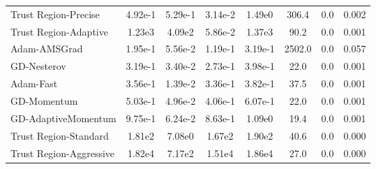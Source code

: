 \documentclass{article}
\begin{document}
\begin{table}[htbp]
{\begin{tabular}{p{2.5cm}*{7}{c}}
Trust Region-Precise & 4.92e-1 & 5.29e-1 & 3.14e-2 & 1.49e0 & 306.4 & 0.0 & 0.002 \\
Trust Region-Adaptive & 1.23e3 & 4.09e2 & 5.86e-2 & 1.37e3 & 90.2 & 0.0 & 0.001 \\
Adam-AMSGrad & 1.95e-1 & 5.56e-2 & 1.19e-1 & 3.19e-1 & 2502.0 & 0.0 & 0.057 \\
GD-Nesterov & 3.19e-1 & 3.40e-2 & 2.73e-1 & 3.98e-1 & 22.0 & 0.0 & 0.001 \\
Adam-Fast & 3.56e-1 & 1.39e-2 & 3.36e-1 & 3.82e-1 & 37.5 & 0.0 & 0.001 \\
GD-Momentum & 5.03e-1 & 4.96e-2 & 4.06e-1 & 6.07e-1 & 22.0 & 0.0 & 0.001 \\
GD-AdaptiveMomentum & 9.75e-1 & 6.24e-2 & 8.63e-1 & 1.09e0 & 19.4 & 0.0 & 0.001 \\
Trust Region-Standard & 1.81e2 & 7.08e0 & 1.67e2 & 1.90e2 & 40.6 & 0.0 & 0.000 \\
Trust Region-Aggressive & 1.82e4 & 7.17e2 & 1.51e4 & 1.86e4 & 27.0 & 0.0 & 0.000 \\
\bottomrule
\end{tabular}
}
\end{table}
\end{document}
